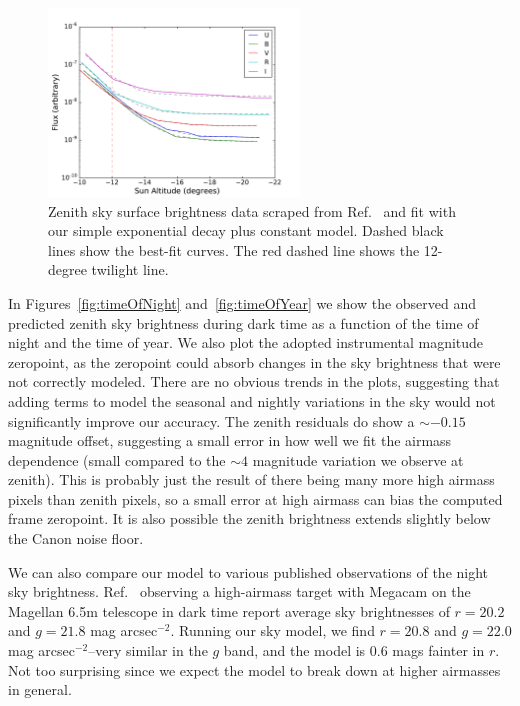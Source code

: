 \documentclass[]{spie}
\begin{document}
\begin{figure}[ht]
  \begin{center}
  \includegraphics[height=5cm]{plots/patatFits.pdf}
  \end{center}
  \caption{Zenith sky surface brightness data scraped from Ref.~ and fit with our simple exponential decay plus constant model. Dashed black lines show the best-fit curves.  The red dashed line shows the 12-degree twilight line.  \label{fig:Patat} }
\end{figure}

\clearpage

In Figures~\ref{fig:timeOfNight} and~\ref{fig:timeOfYear} we show the observed and predicted zenith sky brightness during dark time as a function of the time of night and the time of year.  We also plot the adopted instrumental magnitude zeropoint, as the zeropoint could absorb changes in the sky brightness that were not correctly modeled.  There are no obvious trends in the plots, suggesting that adding terms to model the seasonal and nightly variations in the sky would not significantly improve our accuracy.  The zenith residuals do show a $\sim-0.15$ magnitude offset, suggesting a small error in how well we fit the airmass dependence (small compared to the $\sim4$ magnitude variation we observe at zenith).  This is probably just the result of there being many more high airmass pixels than zenith pixels, so a small error at high airmass can bias the computed frame zeropoint. It is also possible the zenith brightness extends slightly below the Canon noise floor.

We can also compare our model to various published observations of the night sky brightness.  Ref.~ observing a high-airmass target with Megacam on the Magellan 6.5m telescope in dark time report average sky brightnesses of $r=20.2$ and $g=21.8$ mag arcsec$^{-2}$.  Running our sky model, we find  $r=20.8$ and $g=22.0$ mag arcsec$^{-2}$--very similar in the $g$ band, and the model is 0.6 mags fainter in $r$.  Not too surprising since we expect the model to break down at higher airmasses in general.
\end{document}
